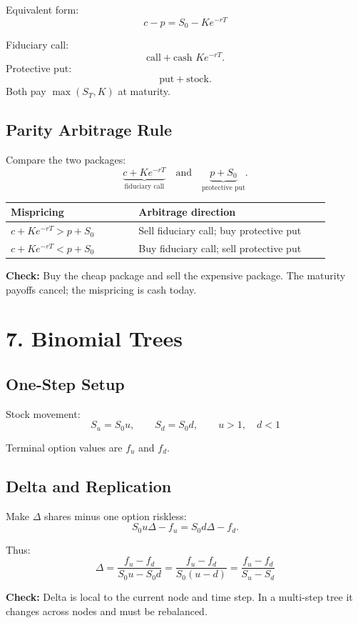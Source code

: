 \documentclass[10pt]{article}
\newcommand{\formula}[1]{\[
    \boxed{\displaystyle #1}
\]}
\newcommand{\note}[1]{\textcolor{accent}{\textbf{Check:}} #1}
\begin{document}
\begin{multicols}{2}
Equivalent form:
\formula{c-p=S_0-Ke^{-rT}}

Fiduciary call:
\[
    \text{call}+\text{cash }Ke^{-rT}.
\]
Protective put:
\[
    \text{put}+\text{stock}.
\]
Both pay $\max(S_T,K)$ at maturity.

\subsection*{Parity Arbitrage Rule}
Compare the two packages:
\[
    \underbrace{c+Ke^{-rT}}_{\text{fiduciary call}}
    \quad\text{and}\quad
    \underbrace{p+S_0}_{\text{protective put}}.
\]

\begin{center}
\begin{tabular}{@{}p{0.36\linewidth}p{0.54\linewidth}@{}}
\toprule
Mispricing & Arbitrage direction \\
\midrule
$c+Ke^{-rT}>p+S_0$ &
Sell fiduciary call; buy protective put \\
$c+Ke^{-rT}<p+S_0$ &
Buy fiduciary call; sell protective put \\
\bottomrule
\end{tabular}
\end{center}

\note{Buy the cheap package and sell the expensive package. The maturity payoffs cancel; the mispricing is cash today.}

\section*{7. Binomial Trees}

\subsection*{One-Step Setup}
Stock movement:
\formula{S_u=S_0u,\qquad S_d=S_0d,\qquad u>1,\quad d<1}

Terminal option values are $f_u$ and $f_d$.

\subsection*{Delta and Replication}
Make $\Delta$ shares minus one option riskless:
\[
    S_0u\Delta-f_u=S_0d\Delta-f_d.
\]

Thus:
\formula{\Delta=\frac{f_u-f_d}{S_0u-S_0d}
=\frac{f_u-f_d}{S_0(u-d)}
=\frac{f_u-f_d}{S_u-S_d}}

\note{Delta is local to the current node and time step. In a multi-step tree it changes across nodes and must be rebalanced.}


\end{multicols}
\end{document}
